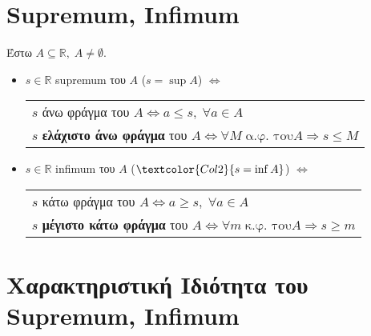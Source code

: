 \documentclass[a4paper,table]{report}
\begin{document}
\section{Supremum, Infimum}

\begin{dfn}
    Έστω $ A \subseteq \mathbb{R}, \; A \neq \emptyset $.
    \begin{itemize}[label=\textcolor{Col1}{\tiny$\blacksquare$}]
        \item $ s \in \mathbb{R} $ \textcolor{Col1}{supremum} του $A$ 
          (\textcolor{Col2}{$s = \sup A $}) 
            $ \Leftrightarrow $ 
            \begin{tabular}[t]{l}
                $s$ άνω φράγμα του $A \Leftrightarrow a \leq s, \; \forall a 
                \in A $ \\
                $s$ \textbf{ελάχιστο άνω φράγμα} του $A  \Leftrightarrow 
                \forall M \; \text{α.φ.\ του} A \Rightarrow s \leq M $
            \end{tabular} 

        \item $ s \in \mathbb{R} $ \textcolor{Col1}{infimum} του $A$ 
            ($ \textcolor{Col2}{s= \inf A} $) 
            $ \Leftrightarrow $ 
            \begin{tabular}[t]{l}
                $s$ κάτω φράγμα του $A \Leftrightarrow a \geq s, \; \forall a 
                \in A $ \\
                $s$ \textbf{μέγιστο κάτω φράγμα} του $A \Leftrightarrow 
                \forall m \; \text{κ.φ.\ του} A \Rightarrow s \geq m $
            \end{tabular} 
    \end{itemize}
\end{dfn}

\section{Χαρακτηριστική Ιδιότητα του Supremum, Infimum}
\end{document}
